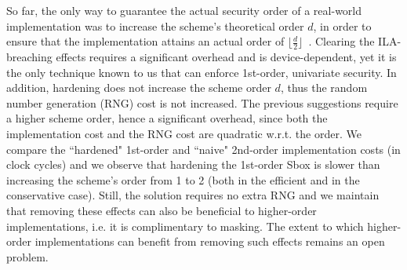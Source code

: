 So far, the only way to guarantee the actual security order of a real-world implementation was to increase the scheme's theoretical order $d$, in order to ensure that the implementation attains an actual order of $\lfloor \frac{d}{2} \rfloor$~\cite{DBLP:conf/cardis/BalaschGGRS14, DBLP:journals/iacr/GrootPPSB16}. Clearing the ILA-breaching effects requires a significant overhead and is device-dependent, yet it is the only technique known to us that can enforce 1st-order, univariate security. In addition, hardening does not increase the scheme order $d$, thus the random number generation (RNG) cost is not increased. The previous suggestions require a higher scheme order, hence a significant overhead, since both the implementation cost and the RNG cost are quadratic w.r.t. the order. We compare the ``hardened" 1st-order and ``naive" 2nd-order implementation costs (in clock cycles) and we observe that hardening the 1st-order Sbox is slower than increasing the scheme's order from 1 to 2 (both in the efficient and in the conservative case). Still, the solution requires no extra RNG and we maintain that removing these effects can also be beneficial to higher-order implementations, i.e. it is complimentary to masking. The extent to which higher-order implementations can benefit from removing such effects remains an open problem.


